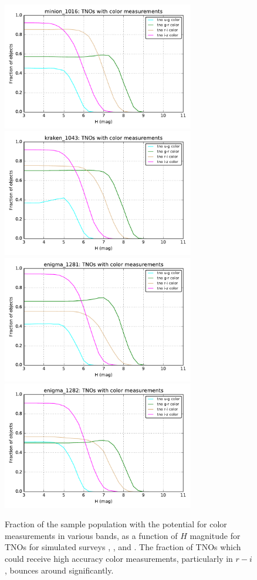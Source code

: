 \begin{figure}
\includegraphics[width=3.3in]{figs/solarsystem/minion_1016_ColorDetermination_i-z_u-g_r-i_g-r_color_tno_MOOB_ComboMetricVsH}
\includegraphics[width=3.3in]{figs/solarsystem/kraken_1043_ColorDetermination_i-z_u-g_r-i_g-r_color_tno_MOOB_ComboMetricVsH}
\\
\includegraphics[width=3.3in]{figs/solarsystem/enigma_1281_ColorDetermination_i-z_u-g_r-i_g-r_color_tno_MOOB_ComboMetricVsH}
\includegraphics[width=3.3in]{figs/solarsystem/enigma_1282_ColorDetermination_i-z_u-g_r-i_g-r_color_tno_MOOB_ComboMetricVsH}
\caption{Fraction of the sample population with the potential for
  color measurements in various bands, as a function of $H$ magnitude
  for TNOs for simulated surveys ,
  , 
  and . The fraction of TNOs which
  could receive high accuracy color measurements, particularly in
  $r-i$, bounces around significantly.
\label{colordetermination}}
\end{figure}

